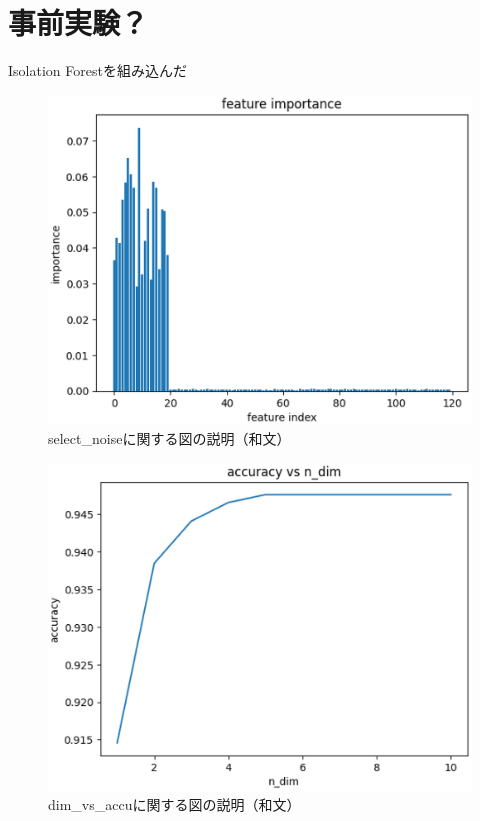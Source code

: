 \documentclass{css}
\begin{document}
\section{事前実験？}
Isolation Forestを組み込んだ

\begin{figure}[tb]
    \centering
    \includegraphics[width=\linewidth]{pictures/eps/select_noise.eps}
    \caption{select\_noiseに関する図の説明（和文）}
    \label{fig:select_noise}
\end{figure}

\begin{figure}[tb]
    \centering
    \includegraphics[width=\linewidth]{pictures/eps/dim_vs_accu.eps}
    \caption{dim\_vs\_accuに関する図の説明（和文）}
    \label{fig:dim_vs_accu}
\end{figure}
\end{document}
